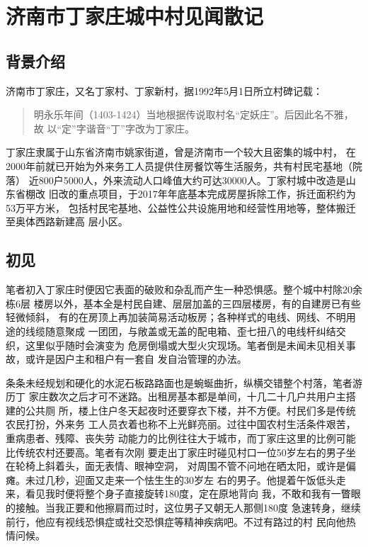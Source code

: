 \chapter{济南市丁家庄城中村见闻散记}

\section{背景介绍}

济南市丁家庄，又名丁家村、丁家新村，据1992年5月1日所立村碑记载：
\begin{quotation}
  明永乐年间（1403-1424）当地根据传说取村名“定妖庄”。后因此名不雅，故
  以“定”字谐音“丁”字改为丁家庄。
\end{quotation}

丁家庄隶属于山东省济南市姚家街道，曾是济南市一个较大且密集的城中村，
在2000年前就已开始为外来务工人员提供住房餐饮等生活服务，共有村民宅基地（院落）
近800户5000人，外来流动人口峰值大约可达30000人。丁家村城中改造是山东省棚改
旧改的重点项目，于2017年年底基本完成房屋拆除工作，拆迁面积约为53万平方米，
包括村民宅基地、公益性公共设施用地和经营性用地等，整体搬迁至奥体西路新建高
层小区。

\section{初见}

笔者初入丁家庄时便因它表面的破败和杂乱而产生一种恐惧感。整个城中村除20余栋6层
楼房以外，基本全是村民自建、层层加盖的三四层楼房，有的自建房已有些轻微倾斜，
有的在房顶上再加装简易活动板房；各种样式的电线、网线、不明用途的线缆随意聚成
一团团，与敞盖或无盖的配电箱、歪七扭八的电线杆纠结交织，这里似乎随时会演变为
危房倒塌或大型火灾现场。笔者倒是未闻未见相关事故，或许是因户主和租户有一套自
发自治管理的办法。

条条未经规划和硬化的水泥石板路路面也是蜿蜒曲折，纵横交错整个村落，笔者游历丁
家庄数次之后才可不迷路。出租房基本都是单间，十几二十几户共用户主搭建的公共厕
所，楼上住户冬天起夜时还要穿衣下楼，并不方便。村民们多是传统农民打扮，外来务
工人员衣着也称不上光鲜亮丽。过往中国农村生活条件艰苦，重病患者、残障、丧失劳
动能力的比例往往大于城市，而丁家庄这里的比例可能比传统农村还要高。笔者有次刚
要走出丁家庄时碰见村口一位50岁左右的男子坐在轮椅上斜着头，面无表情、眼神空洞，
对周围不管不问地在晒太阳，或许是偏瘫。未过几秒，迎面又走来一个怯生生的30岁左
右的男子。他提着午饭低头走来，看见我时便将整个身子直接旋转180度，定在原地背向
我，不敢和我有一瞥眼的接触。当我正要和他擦肩而过时，这位男子又朝无人那侧180度
急速转身，继续前行，他应有视线恐惧症或社交恐惧症等精神疾病吧。不过有路过的村
民向他热情问候。

